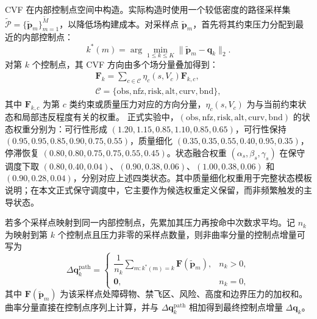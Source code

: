 CVF 在内部控制点空间中构造。实际构造时使用一个较低密度的路径采样集 $\widetilde{\mathcal P}=\{\widetilde{\mathbf p}_m\}_{m=1}^{\widetilde M}$，以降低场构建成本。对采样点 $\widetilde{\mathbf p}_m$，首先将其约束压力分配到最近的内部控制点：
\begin{equation}
    k^*(m)=\arg\min_{1\leq k\leq K}\|\widetilde{\mathbf p}_m-\mathbf{q}_k\|_2 .
    \label{eq:nearest-control}
\end{equation}
对第 $k$ 个控制点，其 CVF 方向由多个场分量叠加得到：
\begin{equation}
    \begin{aligned}
    \mathbf{F}_k =
    \sum_{c\in\mathcal{C}}
    \eta_c(s,V_c)\mathbf{F}_{k,c},\\
    \mathcal{C}=
    \{\mathrm{obs},\mathrm{nfz},\mathrm{risk},\mathrm{alt},\mathrm{curv},\mathrm{bnd}\},
    \end{aligned}
    \label{eq:cvf-field}
\end{equation}
其中 $\mathbf{F}_{k,c}$ 为第 $c$ 类约束或质量压力对应的方向分量，$\eta_c(s,V_c)$ 为与当前约束状态和局部违反程度有关的权重。
正式实验中，$(\mathrm{obs},\mathrm{nfz},\mathrm{risk},\mathrm{alt},\mathrm{curv},\mathrm{bnd})$ 的状态权重分别为：可行性形成 $(1.20,1.15,0.85,1.10,0.85,0.65)$，可行性保持 $(0.95,0.95,0.85,0.90,0.75,0.55)$，质量细化 $(0.35,0.35,0.55,0.40,0.95,0.35)$，停滞恢复 $(0.80,0.80,0.75,0.75,0.55,0.45)$。状态融合权重 $(\alpha_s,\beta_s,\gamma_s)$ 在保守调度下取 $(0.80,0.40,0.04)$、$(0.90,0.38,0.06)$、$(1.00,0.38,0.06)$ 和 $(0.90,0.28,0.04)$，分别对应上述四类状态。其中质量细化权重用于完整状态模板说明；在本文正式保守调度中，它主要作为候选权重定义保留，而非频繁触发的主导状态。

若多个采样点映射到同一内部控制点，先累加其压力再按命中次数求平均。记 $n_k$ 为映射到第 $k$ 个控制点且压力非零的采样点数量，则非曲率分量的控制点增量可写为
\begin{equation}
    \Delta \mathbf q_k^{\mathrm{path}}=
    \begin{cases}
    \dfrac{1}{n_k}\sum_{m:k^*(m)=k}\mathbf F(\widetilde{\mathbf p}_m), & n_k>0,\\[6pt]
    \mathbf 0, & n_k=0,
    \end{cases}
    \label{eq:cvf-average-pressure}
\end{equation}
其中 $\mathbf F(\widetilde{\mathbf p}_m)$ 为该采样点处障碍物、禁飞区、风险、高度和边界压力的加权和。曲率分量直接在控制点序列上计算，并与 $\Delta \mathbf q_k^{\mathrm{path}}$ 相加得到最终控制点增量 $\Delta\mathbf q_k$。

